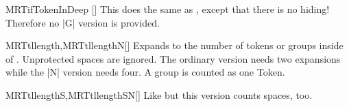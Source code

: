 \begin{describemacroTF}[NN,Nn,nN]{MRTifTokenInDeep}
  []
  This does the same as , except that there is no hiding!
  Therefore no |G| version is provided.
\end{describemacroTF}

\begin{describemacro}{MRTtllength,MRTtllengthN}[]
  Expands to the number of tokens or groups inside of . Unprotected
  spaces are ignored. The ordinary version needs two expansions while the |N|
  version needs four. A group is counted as one Token.
\end{describemacro}

\begin{describemacro}{MRTtllengthS,MRTtllengthSN}[]
  Like  but this version counts spaces, too.
\end{describemacro}

